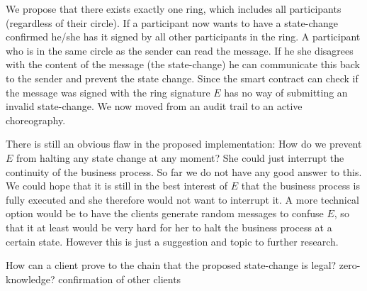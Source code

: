 \documentclass[runningheads]{llncs}
\begin{document}
We propose that there exists exactly one ring, which includes all participants (regardless of their circle). If a participant now wants to have a state-change confirmed he/she has it signed by all other participants in the ring. A participant who is in the same circle as the sender can read the message. If he she disagrees with the content of the message (the state-change) he can communicate this back to the sender and prevent the state change. Since the smart contract can check if the message was signed with the ring signature $E$ has no way of submitting an invalid state-change. We now moved from an audit trail to an active choreography. 

There is still an obvious flaw in the proposed implementation: How do we prevent $E$ from halting any state change at any moment? She could just interrupt the continuity of the business process. So far we do not have any good answer to this. We could hope that it is still in the best interest of $E$ that the business process is fully executed and she therefore would not want to interrupt it. A more technical option would be to have the clients generate random messages to confuse $E$, so that it at least would be very hard for her to halt the business process at a certain state. However this is just a suggestion and topic to further research.


How can a client prove to the chain that the proposed state-change is legal?
zero-knowledge?
confirmation of other clients
\end{document}
